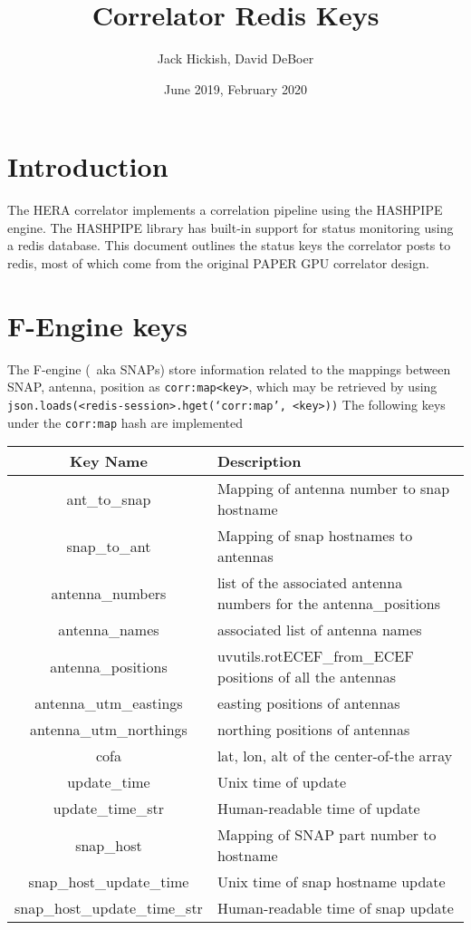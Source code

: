 \documentclass{article}
\title{Correlator Redis Keys}
\author{Jack Hickish, David DeBoer}
\date{June 2019, February 2020}
\begin{document}
\maketitle

\section{Introduction}
The HERA correlator implements a correlation pipeline using the HASHPIPE engine. The HASHPIPE library has built-in support for status monitoring using a redis database.
This document outlines the status keys the correlator posts to redis, most of which come from the original PAPER GPU correlator design.

\section{F-Engine keys}

The F-engine (~aka SNAPs) store information related to the mappings between SNAP, antenna, position as \texttt{corr:map<key>}, which may be retrieved by using \texttt{json.loads(<redis-session>.hget(`corr:map', <key>))}
The following keys under the \texttt{corr:map} hash are implemented

\begin{centering}
\begin{tabular}{c p{}}
\hline
Key Name & Description \\
\hline
\hline
ant\_to\_snap           & Mapping of antenna number to snap hostname \\
snap\_to\_ant           & Mapping of snap hostnames to antennas \\
antenna\_numbers  & list of the associated antenna numbers for the antenna\_positions \\
antenna\_names & associated list of antenna names \\
antenna\_positions                   & uvutils.rotECEF\_from\_ECEF positions of all the antennas \\
antenna\_utm\_eastings & easting positions of antennas \\
antenna\_utm\_northings & northing positions of antennas \\
cofa                          & lat, lon, alt of the center-of-the array \\
update\_time           & Unix time of update \\
update\_time\_str     & Human-readable time of update \\
snap\_host                & Mapping of SNAP part number to hostname \\
snap\_host\_update\_time & Unix time of snap hostname update \\
snap\_host\_update\_time\_str & Human-readable time of snap update\\
\end{tabular}
\end{centering}
\end{document}
